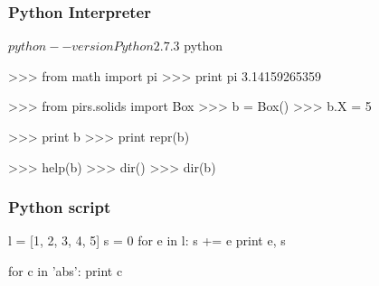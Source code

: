 \begin{frame}[fragile]
    \frametitle{Python Interpreter}

    \begin{bashcode}
        $ python --version
        Python 2.7.3
        $ python
    \end{bashcode}
        
    \begin{pythoncode}
        >>> from math import pi
        >>> print pi
        3.14159265359
        
        >>> from pirs.solids import Box
        >>> b = Box()
        >>> b.X = 5

        >>> print b
        >>> print repr(b)

        >>> help(b)
        >>> dir()
        >>> dir(b)
    \end{pythoncode}

\end{frame}

\begin{frame}[fragile]
    \frametitle{Python script}

        
    \begin{pythoncode}
        l = [1, 2, 3, 4, 5]
        s = 0
        for e in l:
            s += e
            print e, s

        for c in 'abs':
            print c

    \end{pythoncode}

\end{frame}

